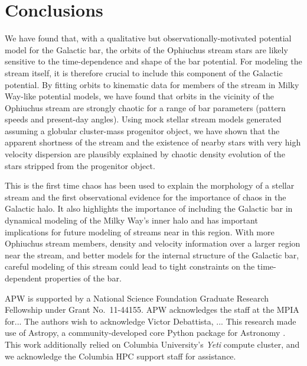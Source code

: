 \documentclass[letterpaper,12pt,preprint]{aastex}
\begin{document}
\section{Conclusions}\label{sec:conclusions}

We have found that, with a qualitative but observationally-motivated potential model for the Galactic bar, the orbits of the Ophiuchus stream stars are likely sensitive to the time-dependence and shape of the bar potential. For modeling the stream itself, it is therefore crucial to include this component of the Galactic potential. By fitting orbits to kinematic data for members of the stream in Milky Way-like potential models, we have found that orbits in the vicinity of the Ophiuchus stream are strongly chaotic for a range of bar parameters (pattern speeds and present-day angles). Using mock stellar stream models generated assuming a globular cluster-mass progenitor object, we have shown that the apparent shortness of the stream and the existence of nearby stars with very high velocity dispersion are plausibly explained by chaotic density evolution of the stars stripped from the progenitor object. 

This is the first time chaos has been used to explain the morphology of a stellar stream and the first observational evidence for the importance of chaos in the Galactic halo. It also highlights the importance of including the Galactic bar in dynamical modeling of the Milky Way's inner halo and has important implications for future modeling of streams near in this region. With more Ophiuchus stream members, density and velocity information over a larger region near the stream, and better models for the internal structure of the Galactic bar, careful modeling of this stream could lead to tight constraints on the time-dependent properties of the bar.

\acknowledgements
APW is supported by a National Science Foundation Graduate Research Fellowship under Grant No.\ 11-44155.
APW acknowledges the staff at the MPIA for...
The authors wish to acknowledge Victor Debattista, ...
This research made use of Astropy, a community-developed core Python package for Astronomy \citep{astropy13}.
This work additionally relied on Columbia University's \emph{Yeti} compute cluster, and we acknowledge the Columbia HPC support staff for assistance. \\




\appendix
\end{document}
